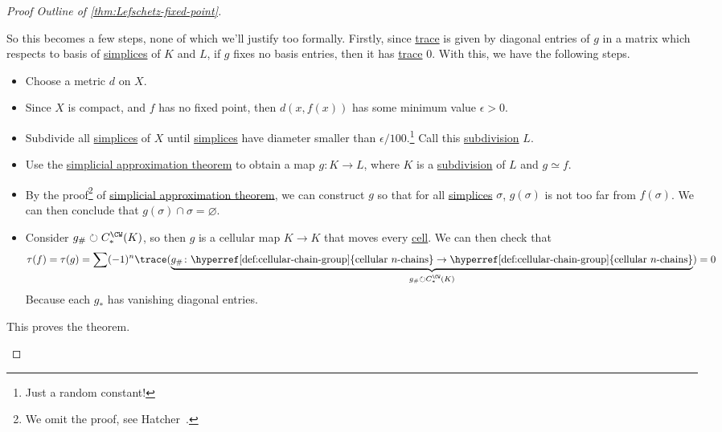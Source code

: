 \begin{proof}[Proof Outline of \autoref{thm:Lefschetz-fixed-point}]
\begin{enumerate}[(a)]
		      So this becomes a few steps, none of which we'll justify too formally. Firstly, since \hyperref[def:trace]{trace} is given by diagonal entries of \(g\) in a matrix which respects to basis of \hyperref[def:standard-simplex]{simplices} of \(K\) and \(L\), if \(g\) fixes no basis entries, then it has \hyperref[def:trace]{trace} \(0\). With this, we have the following steps.
		      \begin{itemize}
			      \item Choose a metric \(d\) on \(X\).
			      \item Since \(X\) is compact, and \(f\) has no fixed point, then \(d(x, f(x))\) has some minimum value \(\epsilon > 0\).
			      \item Subdivide all \hyperref[def:standard-simplex]{simplices} of \(X\) until \hyperref[def:standard-simplex]{simplices} have diameter smaller than \(\epsilon /100\).\footnote{Just a random constant!} Call this \hyperref[eg:Barycentric-subdivision]{subdivision} \(L\).
			      \item Use the \hyperref[thm:simplicial-approximation-theorem]{simplicial approximation theorem} to obtain a map \(g \colon K \to L\), where \(K\) is a \hyperref[eg:Barycentric-subdivision]{subdivision} of \(L\) and \(g \simeq f\).
			      \item By the proof\footnote{We omit the proof, see Hatcher~\cite{hatcher2002algebraic}.} of \hyperref[thm:simplicial-approximation-theorem]{simplicial approximation theorem}, we can construct \(g\) so that for all \hyperref[def:standard-simplex]{simplices} \(\sigma\), \(g(\sigma)\) is not too far from \(f(\sigma)\). We can then conclude that \(g(\sigma) \cap \sigma = \varnothing \).
			      \item Consider \(g_\#\circlearrowright C^{\CW }_\ast (K)\), so then \(g\) is a cellular map \(K \to K\) that moves every \hyperref[def:cell]{cell}. We can then check that
			            \[
				            \tau(f) = \tau(g)
				            = \sum (-1)^n \trace(\underbrace{g_\# \colon \text{\hyperref[def:cellular-chain-group]{cellular \(n\)-chains}} \to \text{\hyperref[def:cellular-chain-group]{cellular \(n\)-chains}}}_{g_\#\circlearrowright C^{\CW }_\ast (K)}) = 0
			            \]
			            Because each \(g_\ast\) has vanishing diagonal entries.
		      \end{itemize}
		      This proves the theorem.
	\end{enumerate}
\end{proof}